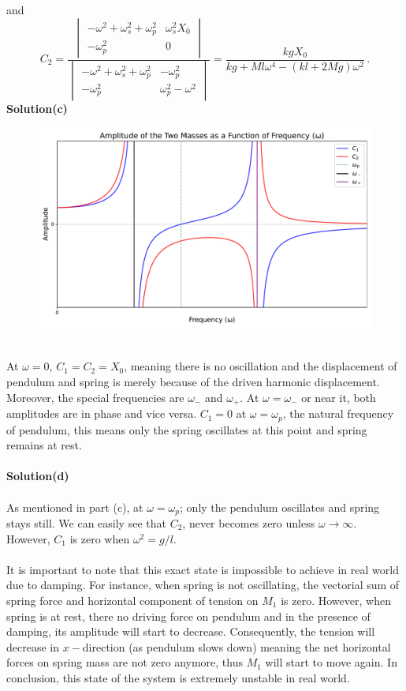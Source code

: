 \documentclass[12pt,a4paper]{article}
\begin{document}
and
\begin{equation}
    C_2=\frac{\begin{vmatrix}
       -\omega^2+\omega_s^2+\omega_p^2  & \omega_s^2X_0 \\
        -\omega_p^2 & 0
    \end{vmatrix}}{\begin{vmatrix}
        -\omega^2+\omega_s^2+\omega_p^2 & -\omega_p^2 \\
        -\omega_p^2 & \omega_p^2-\omega^2
    \end{vmatrix}}=\frac{kgX_0}{kg+Ml\omega^4-(kl+2Mg)\omega^2}\,.
\end{equation}
\textbf{Solution(c)}
\begin{figure}[h]
    \centering
    \includegraphics[width=1\linewidth]{figs/fig_sol_3.4c.pdf}
\end{figure}
\\At $\omega=0$, $C_1=C_2=X_0$, meaning there is no oscillation and the displacement of pendulum and spring is merely because of the driven harmonic displacement. Moreover, the special frequencies are $\omega_-$ and $\omega_+$. At $\omega=\omega_-$ or near it, both amplitudes are in phase and vice versa. $C_1=0$ at $\omega=\omega_p$, the natural frequency of pendulum, this means only the spring oscillates at this point and spring remains at rest.
\\
\\\textbf{Solution(d)}
\\
\\As mentioned in part (c), at $\omega=\omega_p$; only the pendulum oscillates and spring stays still. We can easily see that $C_2$, never becomes zero unless $\omega\rightarrow\infty$. However, $C_1$ is zero when $\omega^2=g/l$.\\
\\
It is important to note that this exact state is impossible to achieve in real world due to damping. For instance, when spring is not oscillating, the vectorial sum of spring force and horizontal component of tension on $M_1$ is zero. However, when spring is at rest, there no driving force on pendulum and in the presence of damping, its amplitude will start to decrease. Consequently, the tension will decrease in $x-$direction (as pendulum slows down) meaning the net horizontal forces on spring mass are not zero anymore, thus $M_1$ will start to move again. In conclusion, this state of the system is extremely unstable in real world.
\end{document}
